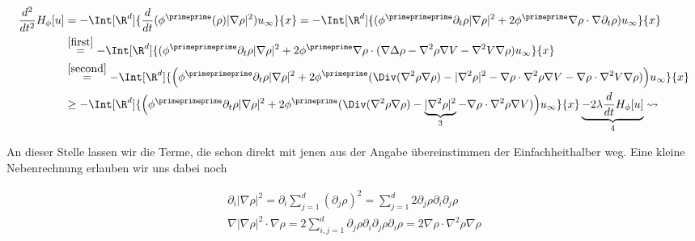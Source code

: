 \begin{solution}
\begin{enumerate}[label = (\roman*)]
  \begin{align*}
    \frac{d^2}{dt^2}H_\phi[u]
    &=
    -\Int[\R^d]{\frac{d}{dt}(\phi^\primeprime(\rho) |\nabla \rho|^2) u_\infty}{x}
    =
    -\Int[\R^d]{(\phi^\primeprimeprime \partial_t\rho |\nabla \rho|^2 + 2\phi^\primeprime \nabla \rho \cdot \nabla \partial_t \rho) u_\infty}{x} \\
    &\stackrel{\ref{first}}{=}
    -\Int[\R^d]{
    (\phi^\primeprimeprime \partial_t\rho |\nabla \rho|^2 +2 \phi^\primeprime \nabla \rho \cdot (\nabla \Delta \rho - \nabla^2 \rho \nabla V - \nabla^2V \nabla \rho)u_\infty
    }{x} \\
    &\stackrel{\ref{second}}{=}
    -\Int[\R^d]{
    \Big(\phi^\primeprimeprime
    \partial_t\rho
    |\nabla \rho|^2
    +
    2 \phi^\primeprime(
    \Div(\nabla^2 \rho \nabla \rho) - |\nabla^2 \rho|^2
    -
    \nabla \rho \cdot \nabla^2 \rho \nabla V
    -
    \nabla \rho \cdot\nabla^2V \nabla \rho)\Big)u_\infty
    }{x}\\
    &\geq
    -\Int[\R^d]{
    \Big(\phi^\primeprimeprime
    \partial_t\rho
    |\nabla \rho|^2
    +
    2 \phi^\primeprime(
    \Div(\nabla^2 \rho \nabla \rho) - \underbrace{|\nabla^2 \rho|^2}_{3}
    -
    \nabla \rho \cdot \nabla^2 \rho \nabla V)\Big)u_\infty}{x}
    \underbrace{-2 \lambda \frac{d}{dt} H_\phi[u]}_{4}
    \rightsquigarrow
  \end{align*}

  An dieser Stelle lassen wir die Terme, die schon direkt mit jenen aus der Angabe übereinstimmen der Einfachheithalber weg. Eine kleine Nebenrechnung erlauben wir uns dabei noch

  \begin{align}
    \partial_i |\nabla \rho|^2
    =
    \partial_i \sum_{j=1}^d (\partial_j \rho)^2
    =
    \sum_{j=1}^d 2 \partial_j \rho \partial_i \partial_j \rho
    \\ \label{third}
    \nabla |\nabla \rho|^2 \cdot \nabla \rho
    =
    2\sum_{i,j=1}^d \partial_j \rho \partial_i \partial_j \rho \partial_i \rho
    =
    2 \nabla \rho \cdot \nabla^2\rho \nabla \rho
  \end{align}


\end{enumerate}
\end{solution}
